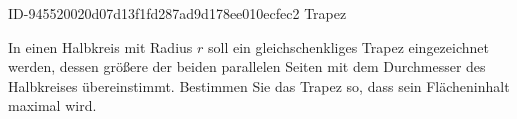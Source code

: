 \begin{exercise}
      {ID-945520020d07d13f1fd287ad9d178ee010ecfec2}
      {Trapez}
  \ifproblem\problem\par
    In einen Halbkreis mit Radius $r$ soll ein gleichschenkliges Trapez
    eingezeichnet werden, dessen größere der beiden parallelen Seiten
    mit dem Durchmesser des Halbkreises übereinstimmt. Bestimmen
    Sie das Trapez so, dass sein Flächeninhalt maximal wird.
  \fi
\end{exercise}
